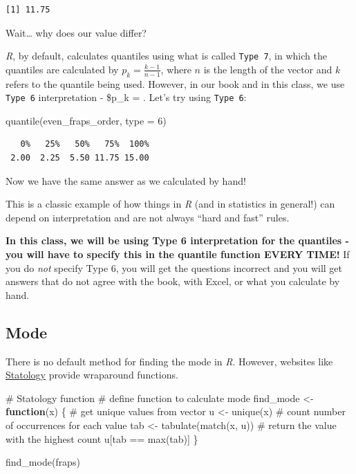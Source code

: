 \documentclass[
  letterpaper,
  DIV=11,
  numbers=noendperiod]{scrreprt}
\newenvironment{Shaded}{\begin{snugshade}}{\end{snugshade}}
\newcommand{\AttributeTok}[1]{\textcolor[rgb]{0.40,0.45,0.13}{#1}}
\newcommand{\CommentTok}[1]{\textcolor[rgb]{0.37,0.37,0.37}{#1}}
\newcommand{\ControlFlowTok}[1]{\textcolor[rgb]{0.00,0.23,0.31}{\textbf{#1}}}
\newcommand{\DecValTok}[1]{\textcolor[rgb]{0.68,0.00,0.00}{#1}}
\newcommand{\FunctionTok}[1]{\textcolor[rgb]{0.28,0.35,0.67}{#1}}
\newcommand{\NormalTok}[1]{\textcolor[rgb]{0.00,0.23,0.31}{#1}}
\newcommand{\OtherTok}[1]{\textcolor[rgb]{0.00,0.23,0.31}{#1}}
\newcommand{\SpecialCharTok}[1]{\textcolor[rgb]{0.37,0.37,0.37}{#1}}
\begin{document}
\begin{verbatim}
[1] 11.75
\end{verbatim}

Wait\ldots{} why does our value differ?

\emph{R}, by default, calculates quantiles using what is called
\texttt{Type\ 7}, in which the quantiles are calculated by
\(p_k = \frac{k-1}{n-1}\), where \(n\) is the length of the vector and
\(k\) refers to the quantile being used. However, in our book and in
this class, we use \texttt{Type\ 6} interpretation - \$p\_k =
. Let's try using \texttt{Type\ 6}:

\begin{Shaded}
\begin{Highlighting}[]
\FunctionTok{quantile}\NormalTok{(even\_fraps\_order, }\AttributeTok{type =} \DecValTok{6}\NormalTok{)}
\end{Highlighting}
\end{Shaded}

\begin{verbatim}
   0%   25%   50%   75%  100% 
 2.00  2.25  5.50 11.75 15.00 
\end{verbatim}

Now we have the same answer as we calculated by hand!

This is a classic example of how things in \emph{R} (and in statistics
in general!) can depend on interpretation and are not always ``hard and
fast'' rules.

\textbf{In this class, we will be using Type 6 interpretation for the
quantiles - you will have to specify this in the quantile function EVERY
TIME!} If you do \emph{not} specify Type 6, you will get the questions
incorrect and you will get answers that do not agree with the book, with
Excel, or what you calculate by hand.

\subsection{Mode}\label{mode}

There is no default method for finding the mode in \emph{R}. However,
websites like \href{https://www.statology.org/mode-in-r/}{Statology}
provide wraparound functions.

\begin{Shaded}
\begin{Highlighting}[]
\CommentTok{\# Statology function}
\CommentTok{\# define function to calculate mode}
\NormalTok{find\_mode }\OtherTok{\textless{}{-}} \ControlFlowTok{function}\NormalTok{(x) \{}
  \CommentTok{\# get unique values from vector}
\NormalTok{  u }\OtherTok{\textless{}{-}} \FunctionTok{unique}\NormalTok{(x)}
  \CommentTok{\# count number of occurrences for each value}
\NormalTok{  tab }\OtherTok{\textless{}{-}} \FunctionTok{tabulate}\NormalTok{(}\FunctionTok{match}\NormalTok{(x, u))}
  \CommentTok{\# return the value with the highest count}
\NormalTok{  u[tab }\SpecialCharTok{==} \FunctionTok{max}\NormalTok{(tab)]}
\NormalTok{\}}

\FunctionTok{find\_mode}\NormalTok{(fraps)}
\end{Highlighting}
\end{Shaded}
\end{document}
